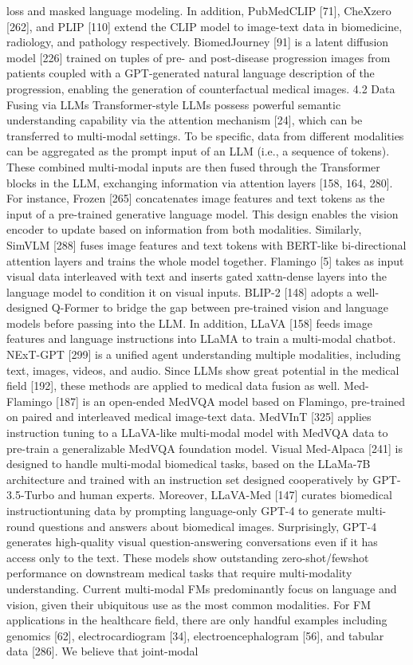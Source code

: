 \documentclass{article}%
\begin{document}
loss and masked language modeling. In addition, PubMedCLIP {[}71{]}, CheXzero {[}262{]}, and PLIP {[}110{]} extend the CLIP model to image{-}text data in biomedicine, radiology, and pathology respectively. BiomedJourney {[}91{]} is a latent diffusion model {[}226{]} trained on tuples of pre{-} and post{-}disease progression images from patients coupled with a GPT{-}generated natural language description of the progression, enabling the generation of counterfactual medical images. 4.2 Data Fusing via LLMs Transformer{-}style LLMs possess powerful semantic understanding capability via the attention mechanism {[}24{]}, which can be transferred to multi{-}modal settings. To be specific, data from different modalities can be aggregated as the prompt input of an LLM (i.e., a sequence of tokens). These combined multi{-}modal inputs are then fused through the Transformer blocks in the LLM, exchanging information via attention layers {[}158, 164, 280{]}. For instance, Frozen {[}265{]} concatenates image features and text tokens as the input of a pre{-}trained generative language model. This design enables the vision encoder to update based on information from both modalities. Similarly, SimVLM {[}288{]} fuses image features and text tokens with BERT{-}like bi{-}directional attention layers and trains the whole model together. Flamingo {[}5{]} takes as input visual data interleaved with text and inserts gated xattn{-}dense layers into the language model to condition it on visual inputs. BLIP{-}2 {[}148{]} adopts a well{-}designed Q{-}Former to bridge the gap between pre{-}trained vision and language models before passing into the LLM. In addition, LLaVA {[}158{]} feeds image features and language instructions into LLaMA to train a multi{-}modal chatbot. NExT{-}GPT {[}299{]} is a unified agent understanding multiple modalities, including text, images, videos, and audio. Since LLMs show great potential in the medical field {[}192{]}, these methods are applied to medical data fusion as well. Med{-}Flamingo {[}187{]} is an open{-}ended MedVQA model based on Flamingo, pre{-}trained on paired and interleaved medical image{-}text data. MedVInT {[}325{]} applies instruction tuning to a LLaVA{-}like multi{-}modal model with MedVQA data to pre{-}train a generalizable MedVQA foundation model. Visual Med{-}Alpaca {[}241{]} is designed to handle multi{-}modal biomedical tasks, based on the LLaMa{-}7B architecture and trained with an instruction set designed cooperatively by GPT{-}3.5{-}Turbo and human experts. Moreover, LLaVA{-}Med {[}147{]} curates biomedical instructiontuning data by prompting language{-}only GPT{-}4 to generate multi{-}round questions and answers about biomedical images. Surprisingly, GPT{-}4 generates high{-}quality visual question{-}answering conversations even if it has access only to the text. These models show outstanding zero{-}shot/fewshot performance on downstream medical tasks that require multi{-}modality understanding. Current multi{-}modal FMs predominantly focus on language and vision, given their ubiquitous use as the most common modalities. For FM applications in the healthcare field, there are only handful examples including genomics {[}62{]}, electrocardiogram {[}34{]}, electroencephalogram {[}56{]}, and tabular data {[}286{]}. We believe that joint{-}modal 
\end{document}

